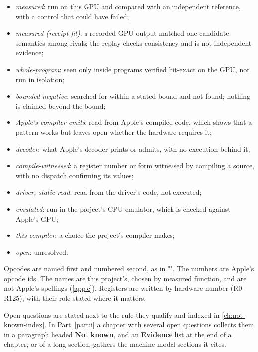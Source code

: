 \begin{itemize}
\item \emph{measured}: run on this GPU and compared with an independent reference, with a control that could have failed;
\item \emph{measured (receipt fit)}: a recorded GPU output matched one candidate semantics among rivals; the replay checks
  consistency and is not independent evidence;
\item \emph{whole-program}: seen only inside programs verified bit-exact on the GPU, not run in isolation;
\item \emph{bounded negative}: searched for within a stated bound and not found; nothing is claimed beyond the bound;
\item \emph{Apple's compiler emits}: read from Apple's compiled code, which shows that a pattern works but leaves open
  whether the hardware requires it;
\item \emph{decoder}: what Apple's decoder prints or admits, with no execution behind it;
\item \emph{compile-witnessed}: a register number or form witnessed by compiling a source, with no dispatch confirming
  its values;
\item \emph{driver, static read}: read from the driver's code, not executed;
\item \emph{emulated}: run in the project's CPU emulator, which is checked against Apple's GPU;
\item \emph{this compiler}: a choice the project's compiler makes;
\item \emph{open}: unresolved.
\end{itemize}

Opcodes are named first and numbered second, as in "". The numbers are
Apple's opcode ids. The names are this project's, chosen by measured function, and are not Apple's spellings
(\cref{app:c}). Registers are written by hardware number (R0–R125), with their role stated where it matters.

Open questions are stated next to the rule they qualify and indexed in \cref{ch:not-known-index}. In Part~\ref{part:i}
a chapter with several open questions collects them in a paragraph headed \textbf{Not known}, and an \textbf{Evidence} list at the
end of a chapter, or of a long section, gathers the machine-model sections it cites.
